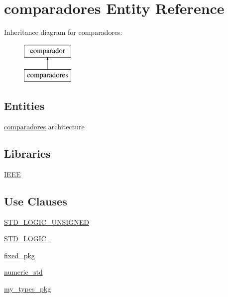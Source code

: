 \hypertarget{classcomparadores}{}\section{comparadores Entity Reference}
\label{classcomparadores}
Inheritance diagram for comparadores\+:\begin{figure}[H]
\begin{center}
\leavevmode
\includegraphics[height=2.000000cm]{classcomparadores}
\end{center}
\end{figure}
\subsection*{Entities}
\begin{DoxyCompactItemize}
\item 
\hyperlink{classcomparadores_1_1comparadores}{comparadores} architecture
\end{DoxyCompactItemize}
\subsection*{Libraries}
 \begin{DoxyCompactItemize}
\item 
\hyperlink{classcomparadores_ae4f03c286607f3181e16b9aa12d0c6d4}{I\+E\+E\+E} 
\end{DoxyCompactItemize}
\subsection*{Use Clauses}
 \begin{DoxyCompactItemize}
\item 
\hyperlink{classcomparadores_a241c3e72dd8024cc8ae831b1b2aed7db}{S\+T\+D\+\_\+\+L\+O\+G\+I\+C\+\_\+\+U\+N\+S\+I\+G\+N\+E\+D}   
\item 
\hyperlink{classcomparadores_aa4b2b25246a821511120e3149b003563}{S\+T\+D\+\_\+\+L\+O\+G\+I\+C\+\_}   
\item 
\hyperlink{classcomparadores_aad86249c80e8c1e7ee1c4748aba748e3}{fixed\+\_\+pkg}   
\item 
\hyperlink{classcomparadores_a2edc34402b573437d5f25fa90ba4013e}{numeric\+\_\+std}   
\item 
\hyperlink{classcomparadores_ac1788a894930eeee5aaed06b4775d746}{my\+\_\+types\+\_\+pkg}   
\end{DoxyCompactItemize}
